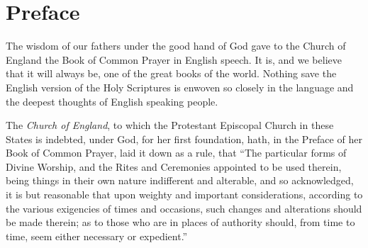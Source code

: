 \chapter{Preface}

The wisdom of our fathers under the good hand of God gave to the Church of England the Book of Common Prayer in English speech. It is, and we believe that it will always be, one of the great books of the world. Nothing save the English version of the Holy Scriptures is enwoven so closely in the language and the deepest thoughts of English speaking people.







The \emph{Church of England}, to which the Protestant Episcopal Church in these States is indebted, under God, for her first foundation, hath, in the Preface of her Book of Common Prayer, laid it down as a rule, that “The particular forms of Divine Worship, and the Rites and Ceremonies appointed to be used therein, being things in their own nature indifferent and alterable, and so acknowledged, it is but reasonable that upon weighty and important considerations, according to the various exigencies of times and occasions, such changes and alterations should be made therein; as to those who are in places of authority should, from time to time, seem either necessary or expedient.”


